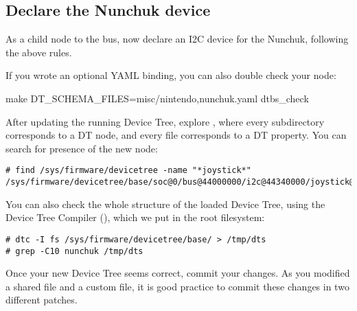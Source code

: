 \subsection{Declare the Nunchuk device}

As a child node to the  bus, now declare an I2C device
for the Nunchuk, following the above rules.

If you wrote an optional YAML binding, you can also double check your
node:
\begin{bashinput}
make DT_SCHEMA_FILES=misc/nintendo,nunchuk.yaml dtbs_check
\end{bashinput}

After updating the running Device Tree, explore
, where every subdirectory corresponds to
a DT node, and every file corresponds to a DT property. You can search
for presence of the new  node:

{\small
\begin{verbatim}
# find /sys/firmware/devicetree -name "*joystick*"
/sys/firmware/devicetree/base/soc@0/bus@44000000/i2c@44340000/joystick@52
\end{verbatim}
}

You can also check the whole structure of the loaded Device Tree, using
the Device Tree Compiler (), which we put in the root
filesystem:
\begin{verbatim}
# dtc -I fs /sys/firmware/devicetree/base/ > /tmp/dts
# grep -C10 nunchuk /tmp/dts
\end{verbatim}

Once your new Device Tree seems correct, commit your changes. As you
modified a shared file and a custom file, it is good practice to commit
these changes in two different patches.
